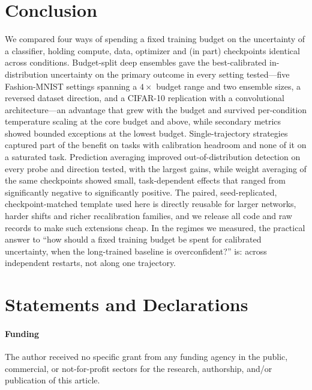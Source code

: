 \documentclass[11pt,a4paper]{article}
\begin{document}
\section{Conclusion}\label{sec:conclusion}

We compared four ways of spending a fixed training budget on the
uncertainty of a classifier, holding compute, data, optimizer and (in part)
checkpoints identical across conditions. Budget-split deep ensembles gave
the best-calibrated in-distribution uncertainty on the primary outcome in
every setting tested---five Fashion-MNIST settings spanning a $4\times$
budget range and two ensemble sizes, a reversed dataset direction, and a
CIFAR-10 replication with a convolutional architecture---an advantage that
grew with the budget and survived per-condition temperature scaling at the
core budget and above, while secondary metrics showed bounded exceptions at
the lowest budget. Single-trajectory strategies captured part of the
benefit on tasks with calibration headroom and none of it on a saturated
task. Prediction averaging improved out-of-distribution detection on
every probe and direction tested, with the largest gains, while weight
averaging of the same checkpoints showed small, task-dependent effects
that ranged from significantly negative to significantly positive. The
paired, seed-replicated, checkpoint-matched template used
here is directly reusable for larger networks, harder shifts and richer
recalibration families, and we release all code and raw records to make
such extensions cheap. In the regimes we measured, the practical answer to
``how should a fixed training budget be spent for calibrated uncertainty,
when the long-trained baseline is overconfident?'' is: across independent
restarts, not along one trajectory.

\section*{Statements and Declarations}

\paragraph{Funding}
The author received no specific grant from any funding agency in the
public, commercial, or not-for-profit sectors for the research,
authorship, and/or publication of this article.
\end{document}
